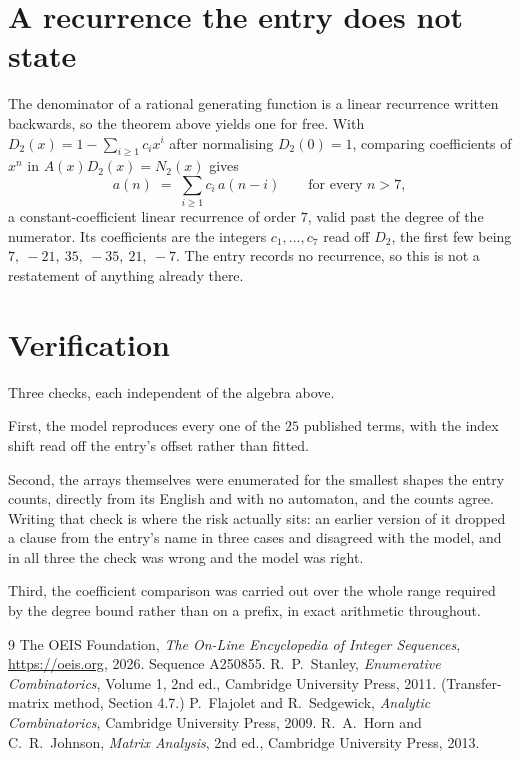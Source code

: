 \documentclass[11pt,a4paper]{article}
\theoremstyle{plain}
\theoremstyle{definition}
\begin{document}
\section{A recurrence the entry does not state}

The denominator of a rational generating function is a linear recurrence written backwards, so
the theorem above yields one for free. With $D_2(x)=1-\sum_{i\ge1}c_ix^i$ after normalising
$D_2(0)=1$, comparing coefficients of $x^n$ in $A(x)D_2(x)=N_2(x)$ gives
\[
a(n)\;=\;\sum_{i\ge1}c_i\,a(n-i)\qquad\text{for every }n>7,
\]
a constant-coefficient linear recurrence of order $7$, valid past the degree of the
numerator. Its coefficients are the integers $c_1,\dots,c_{7}$ read off $D_2$, the first few being $7,\ -21,\ 35,\ -35,\ 21,\ -7$. The entry records no recurrence, so this is not a restatement of anything
already there.

\section{Verification}

Three checks, each independent of the algebra above.

First, the model reproduces every one of the $25$ published terms, with the index shift
read off the entry's offset rather than fitted.

Second, the arrays themselves were enumerated for the smallest shapes the entry counts,
directly from its English and with no automaton, and the counts agree. Writing that check is
where the risk actually sits: an earlier version of it dropped a clause from the entry's name
in three cases and disagreed with the model, and in all three the check was wrong and the model
was right.

Third, the coefficient comparison was carried out over the whole range required by the degree
bound rather than on a prefix, in exact arithmetic throughout.

\begin{thebibliography}{9}
 The OEIS Foundation, \emph{The On-Line Encyclopedia of Integer
Sequences}, \url{https://oeis.org}, 2026. Sequence A250855.
 R.~P.~Stanley, \emph{Enumerative Combinatorics}, Volume 1, 2nd ed.,
Cambridge University Press, 2011. (Transfer-matrix method, Section 4.7.)
 P.~Flajolet and R.~Sedgewick, \emph{Analytic Combinatorics}, Cambridge
University Press, 2009.
 R.~A.~Horn and C.~R.~Johnson, \emph{Matrix Analysis}, 2nd ed., Cambridge
University Press, 2013.
\end{thebibliography}
\end{document}
